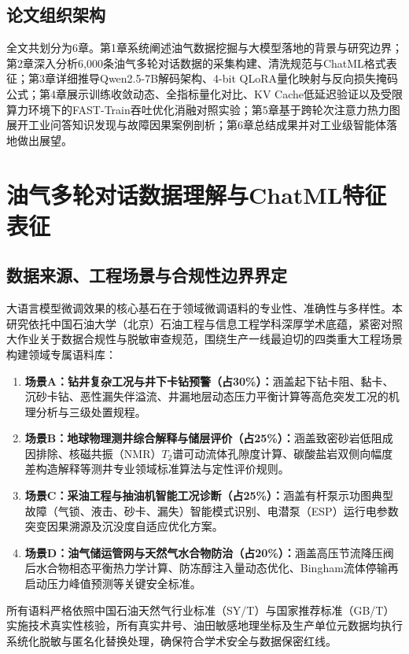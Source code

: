 \documentclass[UTF8,a4paper,zihao=-4,openany,twoside]{ctexbook}
\begin{document}
\section{论文组织架构}
全文共划分为6章。第1章系统阐述油气数据挖掘与大模型落地的背景与研究边界；第2章深入分析6,000条油气多轮对话数据的采集构建、清洗规范与ChatML格式表征；第3章详细推导Qwen2.5-7B解码架构、4-bit QLoRA量化映射与反向损失掩码公式；第4章展示训练收敛动态、全指标量化对比、KV Cache低延迟验证以及受限算力环境下的FAST-Train吞吐优化消融对照实验；第5章基于跨轮次注意力热力图展开工业问答知识发现与故障因果案例剖析；第6章总结成果并对工业级智能体落地做出展望。

\chapter{油气多轮对话数据理解与ChatML特征表征}

\section{数据来源、工程场景与合规性边界界定}
大语言模型微调效果的核心基石在于领域微调语料的专业性、准确性与多样性。本研究依托中国石油大学（北京）石油工程与信息工程学科深厚学术底蕴，紧密对照大作业关于数据合规性与脱敏审查规范，围绕生产一线最迫切的四类重大工程场景构建领域专属语料库：
\begin{enumerate}
    \item \textbf{场景A：钻井复杂工况与井下卡钻预警（占30\%）：}涵盖起下钻卡阻、黏卡、沉砂卡钻、恶性漏失伴溢流、井漏地层动态压力平衡计算等高危突发工况的机理分析与三级处置规程。
    \item \textbf{场景B：地球物理测井综合解释与储层评价（占25\%）：}涵盖致密砂岩低阻成因排除、核磁共振（NMR）$T_2$谱可动流体孔隙度计算、碳酸盐岩双侧向幅度差构造解释等测井专业领域标准算法与定性评价规则。
    \item \textbf{场景C：采油工程与抽油机智能工况诊断（占25\%）：}涵盖有杆泵示功图典型故障（气锁、液击、砂卡、漏失）智能模式识别、电潜泵（ESP）运行电参数突变因果溯源及沉没度自适应优化方案。
    \item \textbf{场景D：油气储运管网与天然气水合物防治（占20\%）：}涵盖高压节流降压阀后水合物相态平衡热力学计算、防冻醇注入量动态优化、Bingham流体停输再启动压力峰值预测等关键安全标准。
\end{enumerate}
所有语料严格依照中国石油天然气行业标准（SY/T）与国家推荐标准（GB/T）实施技术真实性核验，所有真实井号、油田敏感地理坐标及生产单位元数据均执行系统化脱敏与匿名化替换处理，确保符合学术安全与数据保密红线。
\end{document}
